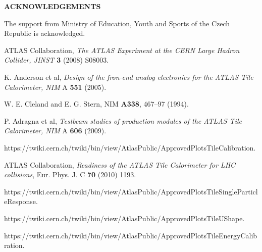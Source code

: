 \documentclass[10pt]{article}
\def\Acknowledgements{\bigskip  \bigskip \begin{center} \begin{large}
             \bf ACKNOWLEDGEMENTS \end{large}\end{center}}
\begin{document}


\Acknowledgements
The support from Ministry of Education, Youth and Sports of the Czech Republic is acknowledged.


\begin{thebibliography}{99}


   ATLAS Collaboration, {\it The ATLAS Experiment at the CERN Large Hadron Collider, JINST} {\bf 3} (2008) S08003.
  
   K. Anderson et al, {\it Design of the fron-end analog electronics for the ATLAS Tile Calorimeter, NIM} A {\bf 551} (2005).
  
   W. E. Cleland and E. G. Stern, NIM {\bf A338}, 467–97 (1994).
  
   P. Adragna et al, {\it Testbeam studies of production modules of the ATLAS Tile Calorimeter, NIM} A {\bf 606} (2009).

   https://twiki.cern.ch/twiki/bin/view/AtlasPublic/ApprovedPlotsTileCalibration.
  
   ATLAS Collaboration, {\it Readiness of the ATLAS Tile Calorimeter for LHC collisions},
Eur. Phys. J. C {\bf 70} (2010) 1193.
  
   https://twiki.cern.ch/twiki/bin/view/AtlasPublic/ApprovedPlotsTileSingleParticleResponse.
 
  https://twiki.cern.ch/twiki/bin/view/AtlasPublic/ApprovedPlotsTileUShape.
 
  https://twiki.cern.ch/twiki/bin/view/AtlasPublic/ApprovedPlotsTileEnergyCalibration.
 
    

\end{thebibliography}
\end{document}

